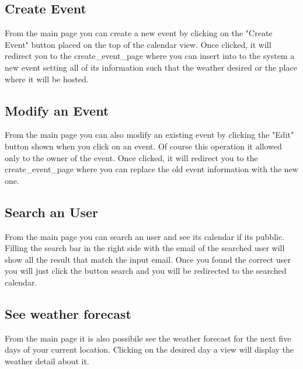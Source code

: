 \subsection{Create Event}
From the main page you can create a new event by clicking on the "Create Event" button placed on the top of the calendar view.
Once clicked, it will redirect you to the create\_event\_page where you can insert into to the system a new event setting all of its information such that the weather desired or the place where it will be hosted.  
\subsection{Modify an Event}
From the main page you can also modify an existing event by clicking the "Edit" button shown when you click on an event. Of course this operation it allowed only to the owner of the event. 
Once clicked, it will redirect you to the create\_event\_page where you can replace the old event information with the new one.
\subsection{Search an User}
From the main page you can search an user and see its calendar if its pubblic.
Filling the search bar in the right side with the email of the searched user will show all the result that match the input email. Once you found the correct user you will just click the button search and you will be redirected to the searched calendar.  
\subsection{See weather forecast}
From the main page it is also possibile see the weather forecast for the next five days of your current location. Clicking on the desired day a view will display the weather detail about it.

 
 
 
 
 
 